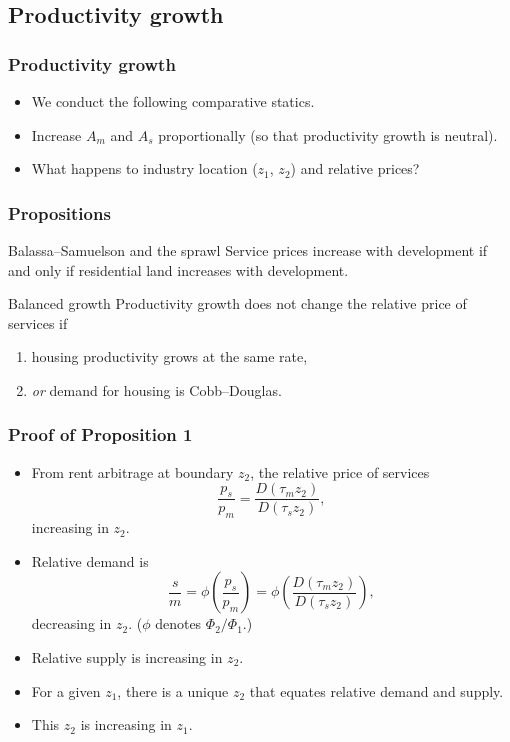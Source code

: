 \documentclass[handout,compress,mathserif]{beamer}
\begin{document}
\subsection{Productivity growth}

\begin{frame}\frametitle{Productivity growth}
\begin{itemize}
\item We conduct the following comparative statics.
\item Increase $A_m$ and $A_s$ proportionally (so that productivity growth is neutral).
\item What happens to industry location ($z_1$, $z_2$) and relative prices?
\end{itemize}
\end{frame}




\begin{frame}\frametitle{Propositions}

\begin{block}{Balassa--Samuelson and the sprawl}
Service prices increase with development if and only if residential land increases with development.
\end{block}
\pause

\begin{block}{Balanced growth}
Productivity growth does not change the relative price of services if
    \begin{enumerate}
      \item housing productivity grows at the same rate,
      \item \emph{or} demand for housing is Cobb--Douglas.
    \end{enumerate}
\end{block}

\end{frame}



\begin{frame}\frametitle{Proof of Proposition 1}
\begin{itemize}
    \item From rent arbitrage at boundary $z_2$, the relative price of services
    \[
    \frac{p_s}{p_m} = \frac{D(\tau_m z_2)}{D(\tau_s z_2)},
    \]
	increasing in $z_2$.
    \item Relative demand is
    \[
    \frac{s}{m} = \phi\left(\frac{p_s}{p_m}\right) = \phi\left(\frac{D(\tau_m z_2)}{D(\tau_s z_2)}\right),
    \]
    decreasing in $z_2$. ($\phi$ denotes $\Phi_2/\Phi_1$.)
    \item Relative supply is increasing in $z_2$. 
    \item For a given $z_1$, there is a unique $z_2$ that equates relative demand and supply. 
    \item This $z_2$ is increasing in $z_1$.
\end{itemize}
\end{frame}
\end{document}
